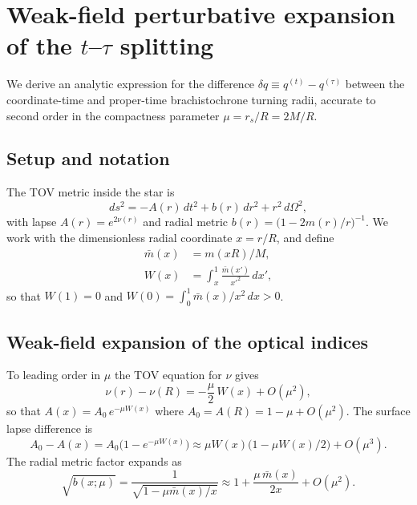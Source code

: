 
\appendix

\section{Weak-field perturbative expansion of the $t$--$\tau$ splitting}
\label{app:weakfield}

We derive an analytic expression for the difference
$\delta q \equiv q^{(t)} - q^{(\tau)}$ between the coordinate-time and
proper-time brachistochrone turning radii, accurate to second order in the
compactness parameter $\mu = r_s/R = 2M/R$.

\subsection{Setup and notation}

The TOV metric inside the star is
\begin{equation}
    ds^2 = -A(r)\,dt^2 + b(r)\,dr^2 + r^2\,d\Omega^2,
\end{equation}
with lapse $A(r) = e^{2\nu(r)}$ and radial metric
$b(r)=\bigl(1-2m(r)/r\bigr)^{-1}$.
We work with the dimensionless radial coordinate $x = r/R$, and define
\begin{align}
    \bar{m}(x) &= m(xR)/M, \\
    W(x) &= \int_x^1 \frac{\bar{m}(x')}{x'^2}\,dx',
    \label{eq:W_def}
\end{align}
so that $W(1)=0$ and $W(0) = \int_0^1 \bar{m}(x)/x^2\,dx > 0$.

\subsection{Weak-field expansion of the optical indices}

To leading order in $\mu$ the TOV equation for $\nu$ gives
\begin{equation}
    \nu(r) - \nu(R) = -\frac{\mu}{2}\,W(x) + O(\mu^2),
\end{equation}
so that $A(x) = A_0\,e^{-\mu W(x)}$ where $A_0 = A(R) = 1-\mu + O(\mu^2)$.
The surface lapse difference is
\begin{equation}
    A_0 - A(x) = A_0\bigl(1 - e^{-\mu W(x)}\bigr) \approx \mu W(x)\bigl(1 - \mu W(x)/2\bigr) + O(\mu^3).
\end{equation}
The radial metric factor expands as
\begin{equation}
    \sqrt{b(x;\mu)} = \frac{1}{\sqrt{1-\mu\bar{m}(x)/x}}
        \approx 1 + \frac{\mu\,\bar{m}(x)}{2x} + O(\mu^2).
    \label{eq:sqrtb}
\end{equation}

